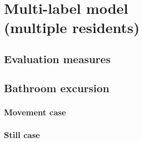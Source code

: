 \documentclass[12pt, a4paper, pdflatex, leqno, twoside, openright]{report}
\begin{document}




\chapter{Multi-label model\\(multiple residents)\label{ch:mlm}}
  \section{Evaluation measures}
  \section{Bathroom excursion}
    \subsection{Movement case}
    \subsection{Still case}
\end{document}
